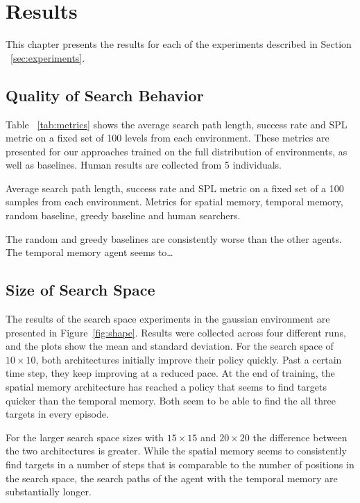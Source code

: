 \chapter{Results}
\label{cha:results}

This chapter presents the results for each of the experiments described in Section ~\ref{sec:experiments}.

\section{Quality of Search Behavior}

Table ~\ref{tab:metrics} shows the average search path length, success rate and SPL metric on a fixed set of 100 levels from each environment.
These metrics are presented for our approaches trained on the full distribution of environments, as well as baselines.
Human results are collected from 5 individuals.

\begin{table}
    \centering
    \label{tab:metrics}
    \caption[Quality results.]{Average search path length, success rate and SPL metric on a fixed set of a 100 samples from each environment. Metrics for spatial memory, temporal memory, random baseline, greedy baseline and human searchers.}
    
\end{table}

The random and greedy baselines are consistently worse than the other agents.
The temporal memory agent seems to\dots

\section{Size of Search Space}

The results of the search space experiments in the gaussian environment are presented in Figure~\ref{fig:shape}.
Results were collected across four different runs, and the plots show the mean and standard deviation.
For the search space of \(10 \times 10\), both architectures initially improve their policy quickly.
Past a certain time step, they keep improving at a reduced pace.
At the end of training, the spatial memory architecture has reached a policy that seems to find targets quicker than the temporal memory.
Both seem to be able to find the all three targets in every episode.

For the larger search space sizes with \(15 \times 15\) and \(20 \times 20\) the difference between the two architectures is greater.
While the spatial memory seems to consistently find targets in a number of steps that is comparable to the number of positions in the search space,
the search paths of the agent with the temporal memory are substantially longer.

